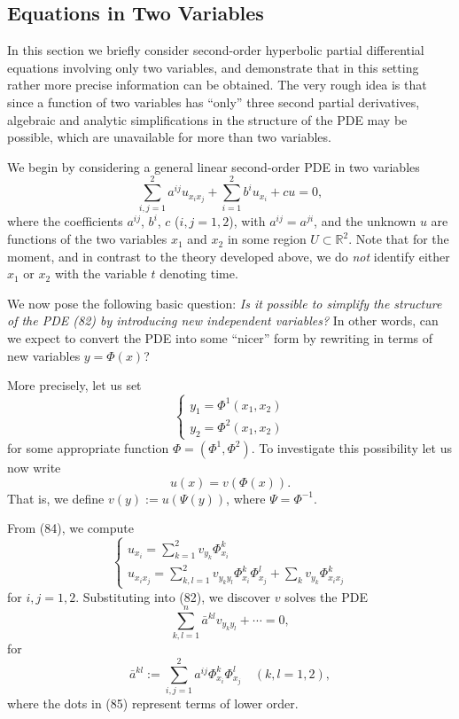 \subsection{Equations in Two Variables}

In this section we briefly consider second-order hyperbolic partial differential equations involving only two variables, and demonstrate that in this setting rather more precise information can be obtained. The very rough idea is that since a function of two variables has ``only'' three second partial derivatives, algebraic and analytic simplifications in the structure of the PDE may be possible, which are unavailable for more than two variables.

We begin by considering a general linear second-order PDE in two variables
\[
\sum_{i,j=1}^{2} a^{ij} u_{x_i x_j} + \sum_{i=1}^{2} b^i u_{x_i} + cu = 0,
\tag{82}
\]
where the coefficients $a^{ij}$, $b^i$, $c$ ($i, j = 1, 2$), with $a^{ij} = a^{ji}$, and the unknown $u$ are functions of the two variables $x_1$ and $x_2$ in some region $U \subset \mathbb{R}^2$. Note that for the moment, and in contrast to the theory developed above, we do \textit{not} identify either $x_1$ or $x_2$ with the variable $t$ denoting time.

We now pose the following basic question: \textit{Is it possible to simplify the structure of the PDE (82) by introducing new independent variables?} In other words, can we expect to convert the PDE into some ``nicer'' form by rewriting in terms of new variables $y = \Phi(x)$?

More precisely, let us set
\[
\left\{ \begin{array}{l} y_1 = \Phi^1(x_1, x_2) \\ y_2 = \Phi^2(x_1, x_2) \end{array} \right.
\tag{83}
\]
for some appropriate function $\Phi = (\Phi^1, \Phi^2)$. To investigate this possibility let us now write
\[
u(x) = v(\Phi(x)).
\tag{84}
\]
That is, we define $v(y) := u(\Psi(y))$, where $\Psi = \Phi^{-1}$.

From (84), we compute
\[
\left\{\begin{array}{l}
u_{x_i} = \sum_{k=1}^2 v_{y_k}\Phi^k_{x_i}\\
u_{x_i x_j} = \sum_{k,l=1}^2 v_{y_k y_l}\Phi^k_{x_i}\Phi^l_{x_j} + \sum_k v_{y_k}\Phi^k_{x_i x_j}
\end{array}\right.
\]
for $i, j = 1, 2$. Substituting into (82), we discover $v$ solves the PDE
\[
\sum_{k,l=1}^n \bar a^{kl}v_{y_k y_l} + \cdots = 0,
\tag{85}
\]
for
\[
\bar{a}^{kl} := \sum_{i,j=1}^2 a^{ij}\Phi^k_{x_i}\Phi^l_{x_j} \quad (k, l = 1, 2),
\tag{86}
\]
where the dots in (85) represent terms of lower order.


